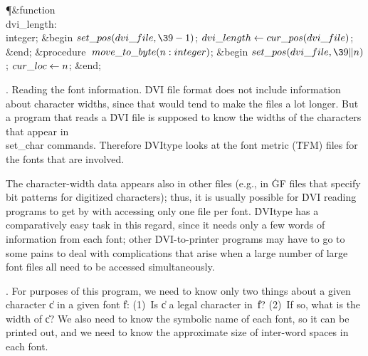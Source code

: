 \Y\P\4\&{function}\1\  \\{dvi\_length}: \\{integer};\2\6
\&{begin} $\\{set\_pos}(\\{dvi\_file},\39-1)$;\5
$\\{dvi\_length}\K\\{cur\_pos}(\\{dvi\_file})$;\6
\&{end};\7
\4\&{procedure}\1\  $\\{move\_to\_byte}(\|n:\\{integer})$;\2\6
\&{begin} $\\{set\_pos}(\\{dvi\_file},\39\|n)$;\5
$\\{cur\_loc}\K\|n$;\6
\&{end};\par
\fi

.  Reading the font information.
\.{DVI} file format does not include information about character widths, since
that would tend to make the files a lot longer. But a program that reads
a \.{DVI} file is supposed to know the widths of the characters that appear
in \\{set\_char} commands. Therefore \.{DVItype} looks at the font metric
(\.{TFM}) files for the fonts that are involved.

The character-width data appears also in other files (e.g., in \.{GF} files
that specify bit patterns for digitized characters);
thus, it is usually possible for \.{DVI} reading programs to get by with
accessing only one file per font. \.{DVItype} has a comparatively easy
task in this regard, since it needs only a few words of information from
each font; other \.{DVI}-to-printer programs may have to go to some pains to
deal with complications that arise when a large number of large font files
all need to be accessed simultaneously.

\fi

. For purposes of this program, we need to know only two things about a
given character \|c in a given font \|f: (1)~Is \|c a legal character
in~\|f? (2)~If so, what is the width of \|c? We also need to know the
symbolic name of each font, so it can be printed out, and we need to know
the approximate size of inter-word spaces in each font.

